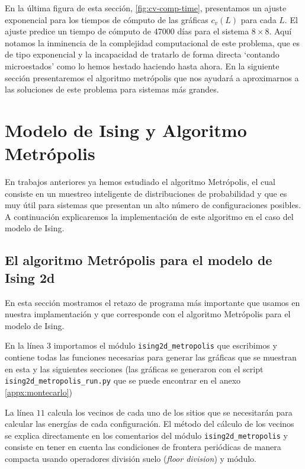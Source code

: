 \documentclass[%
 reprint,
 amsmath,amssymb,
 aps,
 pra,
]{revtex4-2}
\begin{document}
	En la última figura de esta sección, \ref{fig:cv-comp-time}, presentamos un ajuste exponencial para los tiempos de cómputo de las gráficas $c_v(L)$ para cada $L$. El ajuste predice un tiempo de cómputo de 47000 días para el sistema $8 \times 8$. Aquí notamos la inminencia de la complejidad computacional de este problema, que es de tipo exponencial y la incapacidad de tratarlo de forma directa `contando microestados' como lo hemos hestado haciendo hasta ahora. En la siguiente sección presentaremos el algoritmo metrópolis que nos ayudará a aproximarnos a las soluciones de este problema para sistemas más grandes.
		

\section{Modelo de Ising y Algoritmo Metrópolis\label{sec:metropolis}}

En trabajos anteriores ya hemos estudiado el algoritmo Metrópolis, el cual consiste en un muestreo inteligente de distribuciones de probabilidad y que es muy útil para sistemas que presentan un alto número de configuraciones posibles. A continuación explicaremos la implementación de este algoritmo en el caso del modelo de Ising.

	\subsection{El algoritmo Metrópolis para el modelo de Ising 2d\label{subsec:metropolis-algoritmo}}
	
	En esta sección mostramos el retazo de programa más importante que usamos en nuestra implamentación y que corresponde con el algoritmo Metrópolis para el modelo de Ising.

	En la línea 3 importamos el módulo \texttt{ising2d_metropolis} que escribimos y contiene todas las funciones necesarias para generar las gráficas que se muestran en esta y las siguientes secciones (las gráficas se generaron con el script \texttt{ising2d_metropolis_run.py} que se puede encontrar en el anexo \ref{appx:montecarlo})

	La línea $11$ calcula los vecinos de cada uno de los sitios que se necesitarán para calcular las energías de cada configuración. El método del cálculo de los vecinos se explica directamente en los comentarios del módulo \texttt{ising2d_metropolis} y consiste en tener en cuenta las condiciones de frontera periódicas de manera compacta usando operadores división suelo (\textit{floor division}) y módulo.
\end{document}
